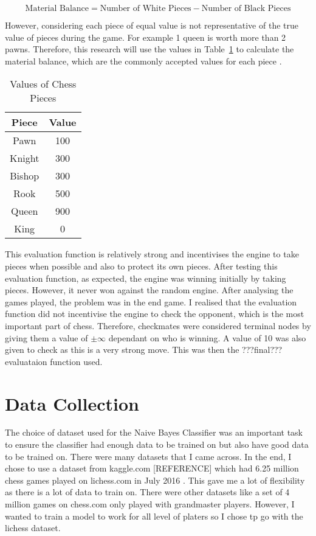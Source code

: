 \begin{equation}
    \label{eq:material}
    \text{Material Balance} = \text{Number of White Pieces} - \text{Number of Black Pieces} 
\end{equation}


However, considering each piece of equal value is not representative of the true value of pieces during the game. For example 1 queen is worth more than 2 pawns. Therefore, this research will use the values in Table~\ref{tab:values} to calculate the material balance, which are the commonly accepted values for each piece \cite{guptaDeterminingChessPiece2023}.

\begin{table}[h]
    \centering
    \begin{tabular}{|c|c|}
        \hline
        \textbf{Piece} & \textbf{Value} \\
        \hline
        Pawn & 100 \\
        Knight & 300 \\
        Bishop & 300 \\
        Rook & 500 \\
        Queen & 900 \\
        King & 0 \\
        \hline
    \end{tabular}
    \caption{Values of Chess Pieces}
    \label{tab:values}
\end{table}

This evaluation function is relatively strong and incentivises the engine to take pieces when possible and also to protect its own pieces. After testing this evaluation function, as expected, the engine was winning initially by taking pieces. However, it never won against the random engine. After analysing the games played, the problem was in the end game. I realised that the evaluation function did not incentivise the engine to check the opponent, which is the most important part of chess. Therefore, checkmates were considered terminal nodes by giving them a value of $\pm \infty$ dependant on who is winning. A value of 10 was also given to check as this is a very strong move. This was then the ???final??? evaluataion function used.


\section{Data Collection}

The choice of dataset used for the Naive Bayes Classifier was an important task to ensure the classifier had enough data to be trained on but also have good data to be trained on. There were many datasets that I came across. In the end, I chose to use a dataset from kaggle.com [REFERENCE] which had 6.25 million chess games played on lichess.com in July 2016 . This gave me a lot of flexibility as there is a lot of data to train on. There were other datasets like a set of 4 million games on chess.com only played with grandmaster players. However, I wanted to train a model to work for all level of platers so I chose tp go with the lichess dataset. 

